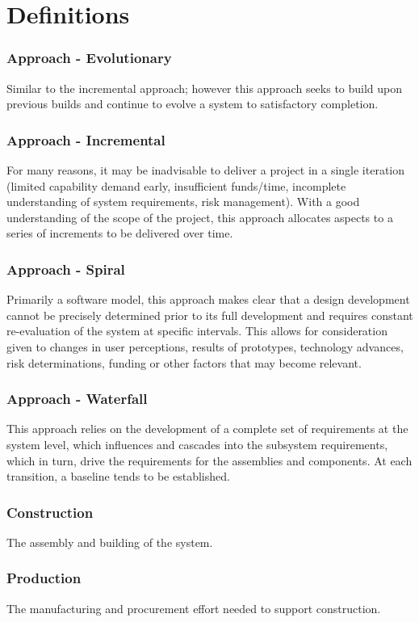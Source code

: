 \documentclass[journal]{IEEEtran}
\begin{document}
\section{Definitions}
\subsubsection{Approach - Evolutionary}
Similar to the incremental approach; however this approach seeks to build upon previous builds and continue to evolve a system to satisfactory completion.
\subsubsection{Approach - Incremental}
For many reasons, it may be inadvisable to deliver a project in a single iteration (limited capability demand early, insufficient funds/time, incomplete understanding of system requirements, risk management). With a good understanding of the scope of the project, this approach allocates aspects to a series of increments to be delivered over time.
\subsubsection{Approach - Spiral}
Primarily a software model, this approach makes clear that a design development cannot be precisely determined prior to its full development and requires constant re-evaluation of the system at specific intervals. This allows for consideration given to changes in user perceptions, results of prototypes, technology advances, risk determinations, funding or other factors that may become relevant.
\subsubsection{Approach - Waterfall}
This approach relies on the development of a complete set of requirements at the system level, which influences and cascades into the subsystem requirements, which in turn, drive the requirements for the assemblies and components. At each transition, a baseline tends to be established.
\subsubsection{Construction}
The assembly and building of the system.
\subsubsection{Production}
The manufacturing and procurement effort needed to support construction.
\end{document}
